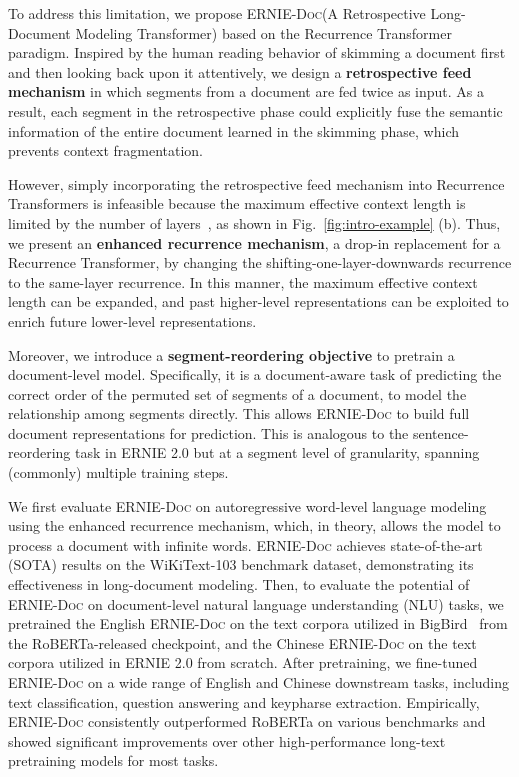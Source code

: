 \documentclass[11pt,a4paper]{article}
\newcommand{\mname}{\textsc{ERNIE-Doc}\xspace}
\begin{document}
To address this limitation, we propose \mname (A Retrospective Long-Document Modeling Transformer) based on the Recurrence Transformer paradigm. Inspired by the human reading behavior of skimming a document first and then looking back upon it attentively, we design a \textbf{retrospective feed mechanism} in which segments from a document are fed twice as input. As a result, each segment in the retrospective phase could explicitly fuse the semantic information of the entire document learned in the skimming phase, which prevents context fragmentation.


However, simply incorporating the retrospective feed mechanism into Recurrence Transformers is infeasible because the maximum effective context length is limited by the number of layers~\citep{transformer_xl}, as shown in Fig.~\ref{fig:intro-example} (b). Thus, we present an \textbf{enhanced recurrence mechanism}, a drop-in replacement for a Recurrence Transformer, by changing the shifting-one-layer-downwards recurrence to the same-layer recurrence. In this manner, the maximum effective context length can be expanded, and past higher-level representations can be exploited to enrich future lower-level representations.

Moreover, we introduce a \textbf{segment-reordering objective} to pretrain a document-level model. Specifically, it is a document-aware task of predicting the correct order of the permuted set of segments of a document, to model the relationship among segments directly. This allows \mname to build full document representations for prediction. This is analogous to the sentence-reordering task in ERNIE 2.0 \citep{sun2020ernie} but at a segment level of granularity, spanning (commonly) multiple training steps. 

We first evaluate \mname on autoregressive word-level language modeling using the enhanced recurrence mechanism, which, in theory, allows the model to process a document with infinite words. \mname achieves state-of-the-art (SOTA) results on the WiKiText-103 benchmark dataset, demonstrating its effectiveness in long-document modeling. Then, to evaluate the potential of \mname on document-level natural language understanding (NLU) tasks, we pretrained the English \mname on the text corpora utilized in BigBird~\citep{zaheer2020big} from the RoBERTa-released checkpoint, and the Chinese \mname on the text corpora utilized in ERNIE 2.0 \citep{sun2020ernie} from scratch. After pretraining, we fine-tuned \mname on a wide range of English and Chinese downstream tasks, including text classification, question answering and keypharse extraction. Empirically, \mname consistently outperformed RoBERTa on various benchmarks and showed significant improvements over other high-performance long-text pretraining models for most tasks.
\end{document}
